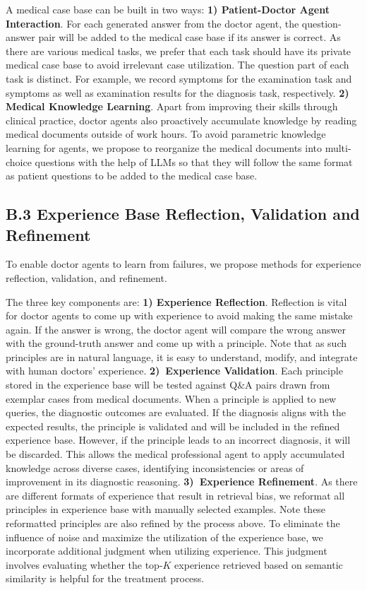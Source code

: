 \documentclass[fleqn,12pt]{wlscirep}
\begin{document}
A medical case base can be built in two ways: 
\textbf{1) Patient-Doctor Agent Interaction}. For each generated answer from the doctor agent, the question-answer pair will be added to the medical case base if its answer is correct. As there are various medical tasks, we prefer that each task should have its private medical case base to avoid irrelevant case utilization. The question part of each task is distinct. For example, we record symptoms for the examination task and symptoms as well as examination results for the diagnosis task, respectively.
\textbf{2) Medical Knowledge Learning}. Apart from improving their skills through clinical practice, doctor agents also proactively accumulate knowledge by reading medical documents outside of work hours. To avoid parametric knowledge learning for agents, we propose to reorganize the medical documents into multi-choice questions with the help of LLMs so that they will follow the same format as patient questions to be added to the medical case base.

\subsection*{B.3 Experience Base Reflection, Validation and Refinement}

To enable doctor agents to learn from failures, we propose methods for experience reflection, validation, and refinement. 

The three key components are: \textbf{1) Experience Reflection}. Reflection is vital for doctor agents to come up with experience to avoid making the same mistake again. If the answer is wrong, the doctor agent will compare the wrong answer with the ground-truth answer and come up with a principle. Note that as such principles are in natural language, it is easy to understand, modify, and integrate with human doctors' experience.
\textbf{2)~Experience Validation}. Each principle stored in the experience base will be tested against Q\&A pairs drawn from exemplar cases from medical documents. When a principle is applied to new queries, the diagnostic outcomes are evaluated. If the diagnosis aligns with the expected results, the principle is validated and will be included in the refined experience base. However, if the principle leads to an incorrect diagnosis, it will be discarded. This allows the medical professional agent to apply accumulated knowledge across diverse cases, identifying inconsistencies or areas of improvement in its diagnostic reasoning.
\textbf{3)~Experience Refinement}. As there are different formats of experience that result in retrieval bias, we reformat all principles in experience base with manually selected examples. Note these reformatted principles are also refined by the process above.
To eliminate the influence of noise and maximize the utilization of the experience base, we incorporate additional judgment when utilizing experience. This judgment involves evaluating whether the top-$K$ experience retrieved based on semantic similarity is helpful for the treatment process. 
\end{document}
